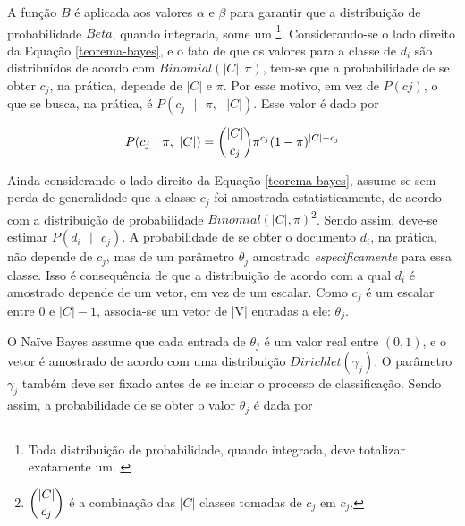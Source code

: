 A função \ensuremath{B} é aplicada aos valores \ensuremath{\alpha} e \ensuremath{\beta} para garantir que a distribuição de probabilidade \ensuremath{Beta}, quando integrada, some um \cite{stat-distribs}\footnote{Toda distribuição de probabilidade, quando integrada, deve totalizar exatamente um. \cite{stat-distribs}}. Considerando-se o lado direito da Equação \ref{teorema-bayes}, e o fato de que os valores para a classe de \ensuremath{d_i} são distribuídos de acordo com \ensuremath{Binomial(|C|, \pi)}, tem-se que a probabilidade de se obter \ensuremath{c_j}, na prática, depende de \ensuremath{|C|} e \ensuremath{\pi}. Por esse motivo, em vez de \ensuremath{P(cj)}, o que se busca, na prática, é \ensuremath{P(c_j\mbox{ } |\mbox{ } \pi,\mbox{ } |C|)}. Esse valor é dado por \cite{resnik}

\begin{equation}
\label{binomial}
\ensuremath{P(c_j\mbox{ } |\mbox{ } \pi,\mbox{ } |C|) =  \dbinom{|C|}{c_j}\pi^{c_j}(1 - \pi)^{|C| - c_j}}
\end{equation}


Ainda considerando o lado direito da Equação \ref{teorema-bayes}, assume-se sem perda de generalidade que a classe \ensuremath{c_j} foi amostrada estatisticamente, de acordo com a distribuição de probabilidade \ensuremath{Binomial(|C|, \pi)}\footnote{\ensuremath{\dbinom{|C|}{c_j}} é a combinação das \ensuremath{|C|} classes tomadas de \ensuremath{c_j} em \ensuremath{c_j}.}. Sendo assim, deve-se estimar \ensuremath{P(d_i\mbox{ } |\mbox{ }c_j)}. A probabilidade de se obter o documento \ensuremath{d_i}, na prática, não depende de \ensuremath{c_j}, mas de um parâmetro \ensuremath{\theta_j} amostrado \emph{especificamente} para essa classe. Isso é consequência de que a distribuição de acordo com a qual \ensuremath{d_i} é amostrado depende de um vetor, em vez de um escalar. Como \ensuremath{c_j} é um escalar entre \ensuremath{0} e \ensuremath{|C| - 1}, associa-se um vetor de |V| entradas a ele: \ensuremath{\theta_j}.


O Naïve Bayes assume que cada entrada de \ensuremath{\theta_j} é um valor real entre \ensuremath{(0,1)}, e o vetor é amostrado de acordo com uma distribuição \ensuremath{Dirichlet(\gamma_j)}. O parâmetro \ensuremath{\gamma_j} também deve ser fixado antes de se iniciar o processo de classificação. Sendo assim, a probabilidade de se obter o valor \ensuremath{\theta_j} é dada por \cite{resnik}

